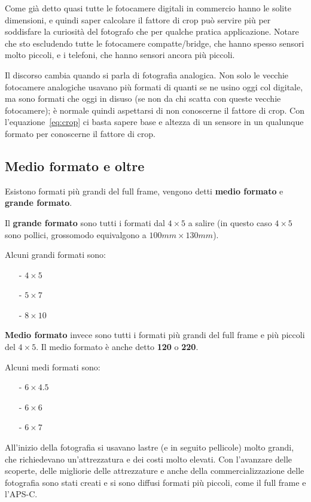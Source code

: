 Come già detto quasi tutte le fotocamere digitali in commercio hanno le solite dimensioni, e quindi saper calcolare il fattore di crop può servire più per soddisfare la curiosità del fotografo che per qualche pratica applicazione. Notare che sto escludendo tutte le fotocamere compatte/bridge, che hanno spesso sensori molto piccoli, e i telefoni, che hanno sensori ancora più piccoli.

Il discorso cambia quando si parla di fotografia analogica.
Non solo le vecchie fotocamere analogiche usavano più formati di quanti se ne usino oggi col digitale, ma sono formati che oggi in disuso (se non da chi scatta con queste vecchie fotocamere); è normale quindi aspettarsi di non conoscerne il fattore di crop.
Con l'equazione~\ref{eq:crop} ci basta sapere base e altezza di un sensore in un qualunque formato per conoscerne il fattore di crop.


\subsection{Medio formato e oltre} \label{subsec:sensorimedioformato}
Esistono formati più grandi del full frame, vengono detti \textbf{medio formato} e \textbf{grande formato}.

Il \textbf{grande formato} sono tutti i formati dal $4 \times 5$ a salire (in questo caso $4 \times 5$ sono pollici, grossomodo equivalgono a $100mm \times 130mm$).

Alcuni grandi formati sono:
\begin{itemize}
    \item[-] $4 \times 5$
    \item[-] $5 \times 7$
    \item[-] $8 \times 10$
\end{itemize}

\textbf{Medio formato} invece sono tutti i formati più grandi del full frame e più piccoli del $4 \times 5$. Il medio formato è anche detto \textbf{120} o \textbf{220}.

Alcuni medi formati sono:
\begin{itemize}
    \item[-] $6 \times 4.5$
    \item[-] $6 \times 6$
    \item[-] $6 \times 7$
\end{itemize}

All'inizio della fotografia si usavano lastre (e in seguito pellicole) molto grandi, che richiedevano un'attrezzatura e dei costi molto elevati. Con l'avanzare delle scoperte, delle migliorie delle attrezzature e anche della commercializzazione delle fotografia sono stati creati e si sono diffusi formati più piccoli, come il full frame e l'APS-C.

